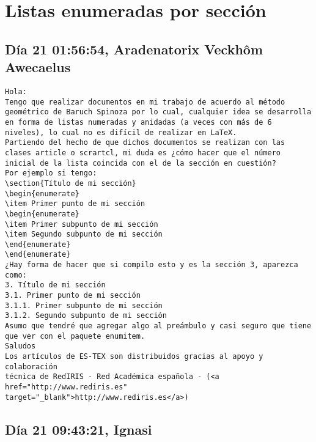 \documentclass[a4paper,10pt]{article}
\begin{document}
\section{Listas enumeradas por sección}

\subsection{Día 21 01:56:54, Aradenatorix Veckhôm Awecaelus}

\begin{lstlisting}
Hola:
Tengo que realizar documentos en mi trabajo de acuerdo al método
geométrico de Baruch Spinoza por lo cual, cualquier idea se desarrolla
en forma de listas numeradas y anidadas (a veces con más de 6
niveles), lo cual no es difícil de realizar en LaTeX.
Partiendo del hecho de que dichos documentos se realizan con las
clases article o scrartcl, mi duda es ¿cómo hacer que el número
inicial de la lista coincida con el de la sección en cuestión?
Por ejemplo si tengo:
\section{Título de mi sección}
\begin{enumerate}
\item Primer punto de mi sección
\begin{enumerate}
\item Primer subpunto de mi sección
\item Segundo subpunto de mi sección
\end{enumerate}
\end{enumerate}
¿Hay forma de hacer que si compilo esto y es la sección 3, aparezca como:
3. Título de mi sección
3.1. Primer punto de mi sección
3.1.1. Primer subpunto de mi sección
3.1.2. Segundo subpunto de mi sección
Asumo que tendré que agregar algo al preámbulo y casi seguro que tiene
que ver con el paquete enumitem.
Saludos
Los artículos de ES-TEX son distribuidos gracias al apoyo y colaboración 
técnica de RedIRIS - Red Académica española - (<a href="http://www.rediris.es" target="_blank">http://www.rediris.es</a>)

\end{lstlisting}

\subsection{Día 21 09:43:21, Ignasi}
\end{document}
